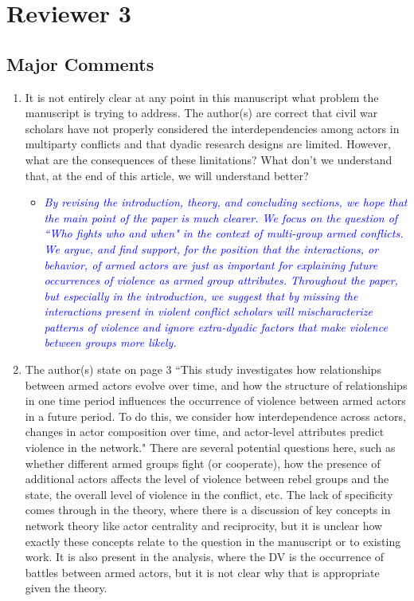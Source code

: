 \section{Reviewer 3}

\subsection{Major Comments}

\begin{enumerate}
	\item It is not entirely clear at any point in this manuscript what problem the manuscript is trying to address. The author(s) are correct that civil war scholars have not properly considered the interdependencies among actors in multiparty conflicts and that dyadic research designs are limited. However, what are the consequences of these limitations? What don't we understand that, at the end of this article, we will understand better?
	\begin{itemize}
		\item \textcolor{blue}{ \emph{
		By revising the introduction, theory, and concluding sections, we hope that the main point of the paper is much clearer. We focus on the question of ``Who fights who and when" in the context of multi-group armed conflicts. We argue, and find support, for the position that the interactions, or behavior, of armed actors are just as important for explaining future occurrences of violence as armed group attributes. Throughout the paper, but especially in the introduction, we suggest that by missing the interactions present in violent conflict scholars will mischaracterize patterns of violence and ignore extra-dyadic factors that make violence between groups more likely.
		}}
	\end{itemize}	
	\item The author(s) state on page 3 ``This study investigates how relationships between armed actors evolve over time, and how the structure of relationships in one time period influences the occurrence of violence between armed actors in a future period. To do this, we consider how interdependence across actors, changes in actor composition over time, and actor-level attributes predict violence in the network." There are several potential questions here, such as whether different armed groups fight (or cooperate), how the presence of additional actors affects the level of violence between rebel groups and the state, the overall level of violence in the conflict, etc. The lack of specificity comes through in the theory, where there is a discussion of key concepts in network theory like actor centrality and reciprocity, but it is unclear how exactly these concepts relate to the question in the manuscript or to existing work. It is also present in the analysis, where the DV is the occurrence of battles between armed actors, but it is not clear why that is appropriate given the theory.	

\end{enumerate}
